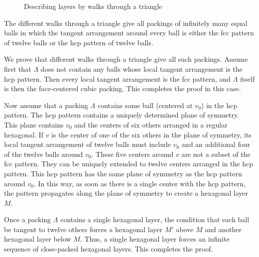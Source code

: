 \begin{figure}[htb]
  \centering
  \caption{Describing layers by walks through a triangle}
  \label{fig:fcc-tri}
\end{figure}


The different walks through a triangle give all packings of
infinitely many equal balls in which the tangent arrangement around
every ball is either the fcc pattern of twelve balls or the hcp
pattern of twelve balls.



We prove that different walks through a triangle give all
such packings. Assume first 
that $\Lambda$ does not contain any balls whose local
tangent arrangement is the hcp pattern.  Then every local tangent
arrangement is the fcc pattern, and $\Lambda$ itself is then the
face-centered cubic packing.  This completes the proof in this case.

Now assume that a packing $\Lambda$ contains some ball
(centered at $v_0$) in the hcp pattern. The hcp pattern contains a
uniquely determined plane of symmetry. This plane contains $v_0$ and
the centers of six others arranged in a regular hexagonal. If $v$ is
the center of one of the six others in the plane of symmetry, its
local tangent arrangement of twelve balls must include $v_0$ and an
additional four of the twelve balls around $v_0$. These five centers
around $v$ are not a subset of the fcc pattern. They can be uniquely
extended to twelve centers arranged in the hcp pattern. This hcp
pattern has the same plane of symmetry as the hcp pattern around
$v_0$. In this way, as soon as there is a single center with the hcp
pattern, the pattern propagates along the plane of symmetry to
create a hexagonal layer $M$.

Once a packing $\Lambda$ contains a single hexagonal layer, the
condition that each ball be tangent to twelve others forces a
hexagonal layer $M'$ above $M$ and another hexagonal layer below
$M$.  Thus, a single hexagonal layer forces an infinite sequence of
close-packed hexagonal layers.  This completes the proof.



